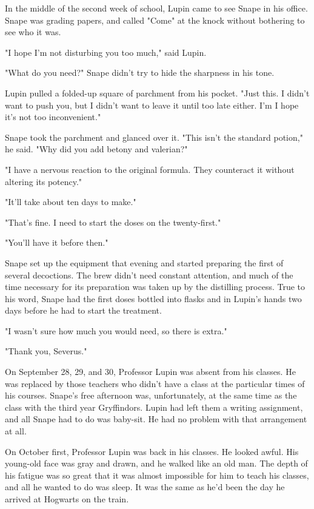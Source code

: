 In the middle of the second week of school, Lupin came to see Snape in his office. Snape was grading papers, and called "Come" at the knock without bothering to see who it was.

"I hope I'm not disturbing you too much," said Lupin.

"What do you need?" Snape didn't try to hide the sharpness in his tone.

Lupin pulled a folded-up square of parchment from his pocket. "Just this. I didn't want to push you, but I didn't want to leave it until too late either. I'm{\el} I hope it's not too inconvenient."

Snape took the parchment and glanced over it. "This isn't the standard potion," he said. "Why did you add betony and valerian?"

"I have a nervous reaction to the original formula. They counteract it without altering its potency."

"It'll take about ten days to make."

"That's fine. I need to start the doses on the twenty-first."

"You'll have it before then."

Snape set up the equipment that evening and started preparing the first of several decoctions. The brew didn't need constant attention, and much of the time necessary for its preparation was taken up by the distilling process. True to his word, Snape had the first doses bottled into flasks and in Lupin's hands two days before he had to start the treatment.

"I wasn't sure how much you would need, so there is extra."

"Thank you, Severus."

On September 28, 29, and 30, Professor Lupin was absent from his classes. He was replaced by those teachers who didn't have a class at the particular times of his courses. Snape's free afternoon was, unfortunately, at the same time as the class with the third year Gryffindors. Lupin had left them a writing assignment, and all Snape had to do was baby-sit. He had no problem with that arrangement at all.

On October first, Professor Lupin was back in his classes. He looked awful. His young-old face was gray and drawn, and he walked like an old man. The depth of his fatigue was so great that it was almost impossible for him to teach his classes, and all he wanted to do was sleep. It was the same as he'd been the day he arrived at Hogwarts on the train.

